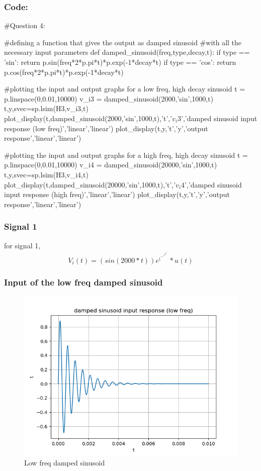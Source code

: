 \documentclass[11pt]{article}
\begin{document}
\subsubsection{Code:}
\begin{python}
#Question 4:

#defining a function that gives the output as damped sinusoid
#with all the necessary input parameters
def damped_sinusoid(freq,type,decay,t):
	if type == 'sin':
		return p.sin(freq*2*p.pi*t)*p.exp(-1*decay*t)
	if type == 'cos':
		return p.cos(freq*2*p.pi*t)*p.exp(-1*decay*t)


#plotting the input and output graphs for a low freq, high decay sinusoid
t = p.linspace(0,0.01,10000)
v_i3 = damped_sinusoid(2000,'sin',1000,t)
t,y,svec=sp.lsim(H3,v_i3,t)
plot_display(t,damped_sinusoid(2000,'sin',1000,t),'t','$v_i3$','damped sinusoid input response (low freq)','linear','linear')
plot_display(t,y,'t','y','output response','linear','linear')


#plotting the input and output graphs for a high freq, high decay sinusoid
t = p.linspace(0,0.01,10000)
v_i4 = damped_sinusoid(20000,'sin',1000,t)
t,y,svec=sp.lsim(H3,v_i4,t)
plot_display(t,damped_sinusoid(20000,'sin',1000,t),'t','$v_i4$','damped sinusoid input response (high freq)','linear','linear')
plot_display(t,y,'t','y','output response','linear','linear')
\end{python}


\subsubsection{Signal 1}
for signal 1, 
\begin{equation}
    V_i(t) = (sin(2000*t))e^(^-^1^0^0^0^*^t^) * u(t)
\end{equation}

\subsubsection{Input of the low freq damped sinusoid}
\begin{figure}[H]
    \centering
    \includegraphics[scale = 1]{Figure_6.png}
    \caption{Low freq damped sinusoid}
\end{figure}
\end{document}
